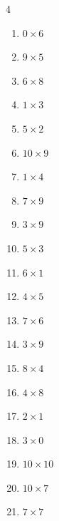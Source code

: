 \begin{multicols}{4}
\begin{enumerate}
  \item $0\times 6$
        \phantom{$=0$}

  \item $9\times 5$
        \phantom{$=45$}

  \item $6\times 8$
        \phantom{$=48$}

  \item $1\times 3$
        \phantom{$=3$}

  \item $5\times 2$
        \phantom{$=10$}

  \item $10\times 9$
        \phantom{$=90$}

\columnbreak %

  \item $1\times 4$
        \phantom{$=4$}

  \item $7\times 9$
        \phantom{$=63$}

  \item $3\times 9$
        \phantom{$=27$}

  \item $5\times 3$
        \phantom{$=15$}

  \item $6\times 1$
        \phantom{$=6$}

  \item $4\times 5$
        \phantom{$=20$}

  \item $7\times 6$
        \phantom{$=42$}

  \item $3\times 9$
        \phantom{$=27$}

  \item $8\times 4$
        \phantom{$=32$}

  \item $4\times 8$
        \phantom{$=32$}

  \item $2\times 1$
        \phantom{$=2$}

  \item $3\times 0$
        \phantom{$=0$}

  \item $10\times 10$
        \phantom{$=100$}

  \item $10\times 7$
        \phantom{$=70$}

  \item $7\times 7$
        \phantom{$=49$}


\end{enumerate}
\end{multicols}
